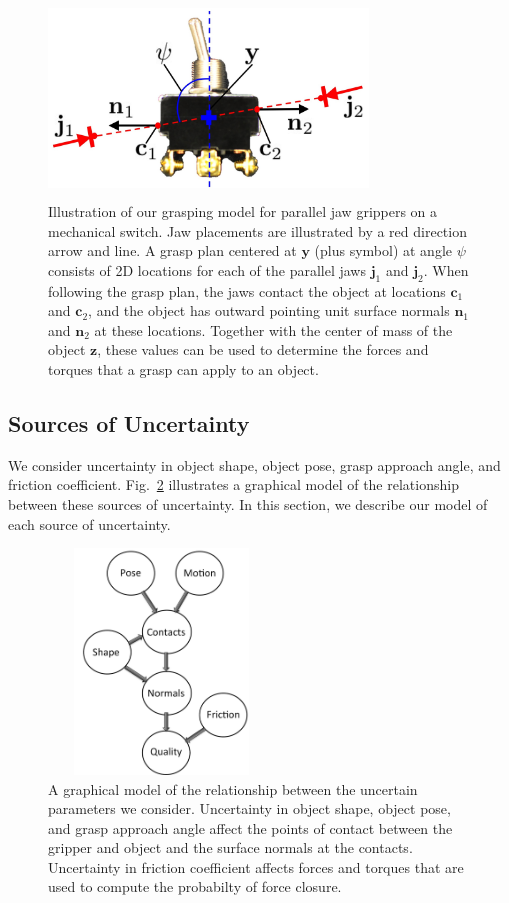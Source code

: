 \documentclass[10pt, conference]{ieeeconf}      %
\newcommand{\bc}{\mathbf{c}}
\newcommand{\bj}{\mathbf{j}}
\newcommand{\bn}{\mathbf{n}}
\newcommand{\by}{\mathbf{y}}
\newcommand{\bz}{\mathbf{z}}
\begin{document}
\begin{figure}[t!]
\centering
\includegraphics[width = 8.5cm, height = 5.25cm]{figures/bandit_grasp_model.jpg}
\caption{Illustration of our grasping model for parallel jaw grippers on a mechanical switch. Jaw placements are illustrated by a red direction arrow and line. A grasp plan centered at $\by$ (plus symbol) at angle $\psi$ consists of 2D locations for each of the parallel jaws $\bj_1$ and $\bj_2$. When following the grasp plan, the jaws contact the object at locations $\bc_1$ and $\bc_2$, and the object has outward pointing unit surface normals $\bn_1$ and $\bn_2$ at these locations. Together with the center of mass of the object $\bz$, these values can be used to determine the forces and torques that a grasp can apply to an object.}
\vspace*{-2ex}
\label{fig:grasp_model}
\end{figure}

\subsection{Sources of Uncertainty}
We consider uncertainty in object shape, object pose, grasp approach angle, and friction coefficient.
Fig.~\ref{fig:graphical_model} illustrates a graphical model of the relationship between these sources of uncertainty.
In this section, we describe our model of each source of uncertainty.

\begin{figure}[ht!]
\centering
\includegraphics[width = 6cm, height = 6cm]{figures/Graphical_Model.jpg}
\caption{A graphical model of the relationship between the uncertain parameters we consider. Uncertainty in object shape, object pose, and grasp approach angle affect the points of contact  between the gripper and object and the surface normals at the contacts. Uncertainty in friction coefficient affects forces and torques that are used to compute the probabilty of force closure.  }
\vspace*{-10pt}
\label{fig:graphical_model}
\end{figure}
\end{document}
